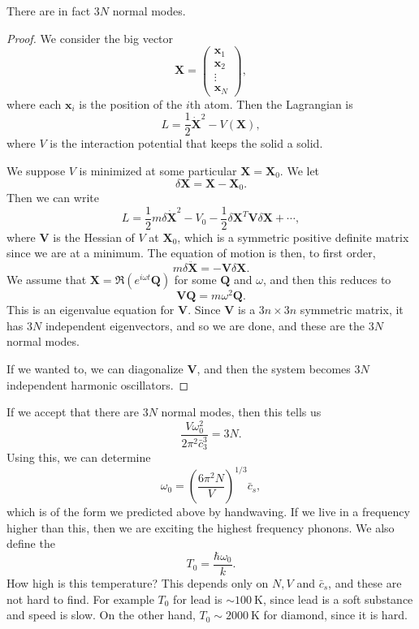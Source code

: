 \documentclass[a4paper]{article}
\begin{document}
\begin{claim}
  There are in fact $3N$ normal modes.
\end{claim}

\begin{proof}
  We consider the big vector
  \[
    \mathbf{X} =
    \begin{pmatrix}
      \mathbf{x}_1\\
      \mathbf{x}_2\\
      \vdots\\
      \mathbf{x}_N
    \end{pmatrix},
  \]
  where each $\mathbf{x}_i$ is the position of the $i$th atom. Then the Lagrangian is
  \[
    L = \frac{1}{2} \dot{\mathbf{X}}^2 - V(\mathbf{X}),
  \]
  where $V$ is the interaction potential that keeps the solid a solid.

  We suppose $V$ is minimized at some particular $\mathbf{X} = \mathbf{X}_0$. We let
  \[
    \delta \mathbf{X} = \mathbf{X} - \mathbf{X}_0.
  \]
  Then we can write
  \[
    L = \frac{1}{2} m \delta \dot{\mathbf{X}}^2 - V_0 - \frac{1}{2} \delta \mathbf{X}^T \mathbf{V} \delta \mathbf{X} + \cdots,
  \]
  where $\mathbf{V}$ is the Hessian of $V$ at $\mathbf{X}_0$, which is a symmetric positive definite matrix since we are at a minimum. The equation of motion is then, to first order,
  \[
    m \delta \ddot{\mathbf{X}} = - \mathbf{V} \delta \mathbf{X}.
  \]
  We assume that $\mathbf{X} = \Re(e^{i \omega t} \mathbf{Q})$ for some $\mathbf{Q}$ and $\omega$, and then this reduces to
  \[
    \mathbf{V} \mathbf{Q} = m \omega^2 \mathbf{Q}.
  \]
  This is an eigenvalue equation for $\mathbf{V}$. Since $\mathbf{V}$ is a $3n \times 3n$ symmetric matrix, it has $3N$ independent eigenvectors, and so we are done, and these are the $3N$ normal modes.

  If we wanted to, we can diagonalize $\mathbf{V}$, and then the system becomes $3N$ independent harmonic oscillators.
\end{proof}

If we accept that there are $3N$ normal modes, then this tells us
\[
  \frac{V \omega_0^2}{ 2\pi^2 \bar{c}_3^3} = 3N.
\]
Using this, we can determine
\[
  \omega_0 = \left(\frac{6 \pi^2 N}{V}\right)^{1/3} \bar{c}_s,
\]
which is of the form we predicted above by handwaving. If we live in a frequency higher than this, then we are exciting the highest frequency phonons. We also define the 
\[
  T_0 = \frac{\hbar \omega_0}{k}.
\]
How high is this temperature? This depends only on $N, V$ and $\bar{c}_s$, and these are not hard to find. For example $T_0$ for lead is $\sim \SI{100}{\kelvin}$, since lead is a soft substance and speed is slow. On the other hand, $T_0 \sim \SI{2000}{\kelvin}$ for diamond, since it is hard.
\end{document}
